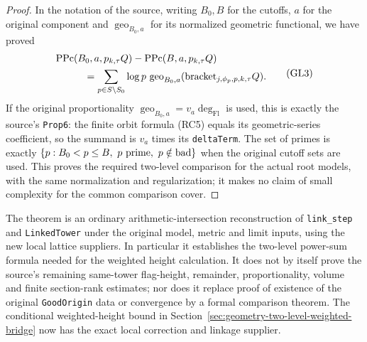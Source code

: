 \begin{proof}
In the notation of the source, writing \(B_0,B\) for the
cutoffs, \(a\) for the original component and
\(\operatorname{geo}_{B_0,a}\) for its normalized
geometric functional, we have proved
\[
 \begin{split}
 &\mathrm{PPc}(B_0,a,p_{k,\tau}Q)
       -\mathrm{PPc}(B,a,p_{k,\tau}Q)\\
 &\hspace{10mm}=\sum_{p\in S\setminus S_0}
       \log p\,\operatorname{geo}_{B_0,a}
                (\mathrm{bracket}_{j,\phi_p,p,k,\tau}Q).
 \end{split}                                                     \tag{GL3}
\]
If the original proportionality
\(\operatorname{geo}_{B_0,a}=v_a\deg_{\mathrm{Fl}}\)
is used, this is exactly the source's \texttt{Prop6}:
the finite orbit formula (RC5) equals its geometric-series
coefficient, so the summand is \(v_a\) times its
\texttt{deltaTerm}. The set of primes is exactly
\(\{p:B_0<p\le B,\ p\ {\rm prime},\ p\notin\mathrm{bad}\}\)
when the original cutoff sets are used.
This proves the required two-level comparison for the
actual root models, with the same normalization and
regularization; it makes no claim of small complexity for
the common comparison cover.
\end{proof}

The theorem is an ordinary arithmetic-intersection
reconstruction of \texttt{link\_step} and
\texttt{LinkedTower} under the original model, metric and
limit inputs, using the new local lattice suppliers.
In particular it establishes the two-level power-sum
formula needed for the weighted height calculation.
It does not by itself prove the source's remaining
same-tower flag-height, remainder, proportionality,
volume and finite section-rank estimates; nor does it
replace proof of existence of the original
\texttt{GoodOrigin} data or convergence by a formal
comparison theorem. The conditional weighted-height
bound in Section~\ref{sec:geometry-two-level-weighted-bridge}
now has the exact local correction and linkage supplier.
